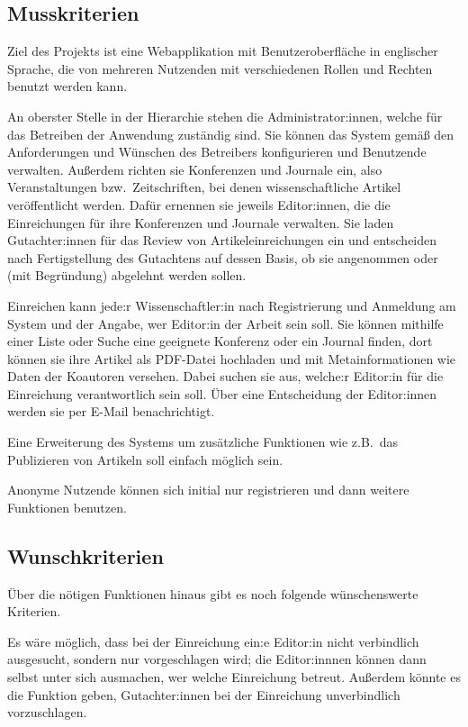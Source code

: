 
\subsection{Musskriterien}
Ziel des Projekts ist eine Webapplikation mit Benutzeroberfläche in englischer Sprache, die von mehreren Nutzenden mit verschiedenen Rollen und Rechten benutzt werden kann.

An oberster Stelle in der Hierarchie stehen die Administrator:innen, welche für das Betreiben der Anwendung zuständig sind.
Sie können das System gemäß den Anforderungen und Wünschen des Betreibers konfigurieren und Benutzende verwalten.
Außerdem richten sie Konferenzen und Journale ein, also Veranstaltungen bzw.\ Zeitschriften, bei denen wissenschaftliche Artikel veröffentlicht werden.
Dafür ernennen sie jeweils Editor:innen, die die Einreichungen für ihre Konferenzen und Journale verwalten.
Sie laden Gutachter:innen für das Review von Artikeleinreichungen ein und entscheiden nach Fertigstellung des Gutachtens auf dessen Basis, ob sie angenommen oder (mit Begründung) abgelehnt werden sollen.

Einreichen kann jede:r Wissenschaftler:in nach Registrierung und Anmeldung am System und der Angabe, wer Editor:in der Arbeit sein soll.
Sie können mithilfe einer Liste oder Suche eine geeignete Konferenz oder ein Journal finden,
dort können sie ihre Artikel als PDF-Datei hochladen und mit Metainformationen wie Daten der Koautoren versehen.
Dabei suchen sie aus, welche:r Editor:in für die Einreichung verantwortlich sein soll.
Über eine Entscheidung der Editor:innen werden sie per E-Mail benachrichtigt.

Eine Erweiterung des Systems um zusätzliche Funktionen wie z.B.\ das Publizieren von Artikeln soll einfach möglich sein.

Anonyme Nutzende können sich initial nur registrieren und dann weitere Funktionen benutzen.

\subsection{Wunschkriterien}

Über die nötigen Funktionen hinaus gibt es noch folgende wünschenswerte Kriterien.

Es wäre möglich, dass bei der Einreichung ein:e Editor:in nicht verbindlich ausgesucht, sondern nur vorgeschlagen wird;
die Editor:innnen können dann selbst unter sich ausmachen, wer welche Einreichung betreut.
Außerdem könnte es die Funktion geben, Gutachter:innen bei der Einreichung unverbindlich vorzuschlagen.

